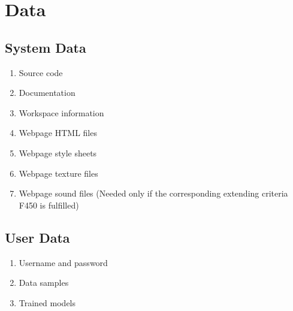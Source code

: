 \section{Data}
\subsection{System Data}
\begin{enumerate}[{label = \textbf{/D{\protect\twodigits{\arabic{enumi}}}0/}, leftmargin = *}]
    \item Source code   %
    \item Documentation %
    \item Workspace information
    \item Webpage HTML files
    \item Webpage style sheets
    \item Webpage texture files
    \item Webpage sound files (Needed only if the corresponding extending criteria F450 is fulfilled)
\end{enumerate}
\subsection{User Data}
\begin{enumerate}[resume*]
    \item Username and password
    \item Data samples
    \item Trained models
\end{enumerate}

